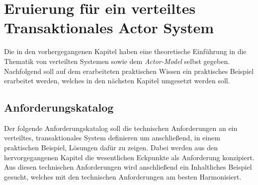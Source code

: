 \chapter{Eruierung für ein verteiltes Transaktionales Actor System} \label{cha:Eruierung}
Die in den vorhergegangenen Kapitel haben eine theoretische Einführung in die Thematik von verteilten Systemen sowie dem \textit{Actor-Model} selbst gegeben. Nachfolgend soll auf dem erarbeiteten praktischen Wissen ein praktisches Beispiel erarbeitet werden, welches in den nächsten Kapitel umgesetzt werden soll.  

\section{Anforderungskatalog}\label{sec:Eruierung:technicalRequierements}
Der folgende Anforderungskatalog soll die technischen Anforderungen an ein verteiltes, transaktionales System definieren um anschließend, in einem praktischen Beispiel, Lösungen dafür zu zeigen. Dabei werden aus den hervorgegangenen Kapitel die  wesentlichen Eckpunkte als Anforderung konzipiert. Aus diesen technischen Anforderungen wird anschließend ein Inhaltliches Beispiel gesucht, welches mit den technischen Anforderungen am besten Harmonisiert.


